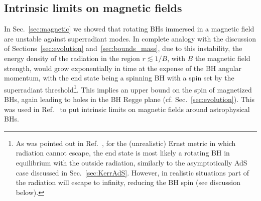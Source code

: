 \documentclass[11pt]{article}
\numberwithin{equation}{section} %
\begin{document}

\subsection{Intrinsic limits on magnetic fields} \label{sec:bounds_magnetic}

In Sec.~\ref{sec:magnetic} we showed that rotating BHs immersed in a magnetic field are unstable against superradiant modes. In complete analogy with the discussion of Sections~\ref{sec:evolution} and~\ref{sec:bounds_mass}, due to this instability, the energy density of the radiation in the region $r\lesssim 1/B$, with $B$ the magnetic field strength, would grow exponentially in time at the expense of the BH angular momentum, with the end state being a spinning BH with a spin set by the superradiant threshold\footnote{As was pointed out in Ref.~\cite{Brito:2014nja}, for the (unrealistic) Ernst metric in which radiation cannot escape, the end state is most likely a rotating BH in equilibrium with the outside radiation, similarly to the asymptotically AdS case discussed in Sec.~\ref{sec:KerrAdS}. However, in realistic situations part of the radiation will escape to infinity, reducing the BH spin (see discussion below).}. This implies an upper bound on the spin of magnetized BHs, again leading to holes in the BH Regge plane (cf. Sec.~\ref{sec:evolution}). This was used in Ref.~\cite{Brito:2014nja} to put intrinsic limits on magnetic fields around astrophysical BHs. 
\end{document}
